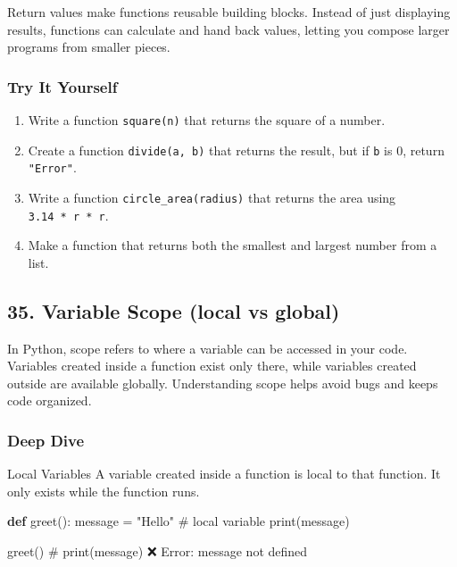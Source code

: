 \documentclass[
  letterpaper,
  DIV=11,
  numbers=noendperiod]{scrreprt}
\newenvironment{Shaded}{\begin{snugshade}}{\end{snugshade}}
\newcommand{\BuiltInTok}[1]{\textcolor[rgb]{0.00,0.23,0.31}{#1}}
\newcommand{\CommentTok}[1]{\textcolor[rgb]{0.37,0.37,0.37}{#1}}
\newcommand{\KeywordTok}[1]{\textcolor[rgb]{0.00,0.23,0.31}{\textbf{#1}}}
\newcommand{\NormalTok}[1]{\textcolor[rgb]{0.00,0.23,0.31}{#1}}
\newcommand{\OperatorTok}[1]{\textcolor[rgb]{0.37,0.37,0.37}{#1}}
\newcommand{\StringTok}[1]{\textcolor[rgb]{0.13,0.47,0.30}{#1}}
\providecommand{\tightlist}{%
  \setlength{\itemsep}{0pt}\setlength{\parskip}{0pt}}
\begin{document}
Return values make functions reusable building blocks. Instead of just
displaying results, functions can calculate and hand back values,
letting you compose larger programs from smaller pieces.

\subsubsection{Try It Yourself}\label{try-it-yourself-33}

\begin{enumerate}
\def\labelenumi{\arabic{enumi}.}
\tightlist
\item
  Write a function \texttt{square(n)} that returns the square of a
  number.
\item
  Create a function \texttt{divide(a,\ b)} that returns the result, but
  if \texttt{b} is 0, return \texttt{"Error"}.
\item
  Write a function \texttt{circle\_area(radius)} that returns the area
  using \texttt{3.14\ *\ r\ *\ r}.
\item
  Make a function that returns both the smallest and largest number from
  a list.
\end{enumerate}

\subsection{35. Variable Scope (local vs
global)}\label{variable-scope-local-vs-global}

In Python, scope refers to where a variable can be accessed in your
code. Variables created inside a function exist only there, while
variables created outside are available globally. Understanding scope
helps avoid bugs and keeps code organized.

\subsubsection{Deep Dive}\label{deep-dive-34}

Local Variables A variable created inside a function is local to that
function. It only exists while the function runs.

\begin{Shaded}
\begin{Highlighting}[]
\KeywordTok{def}\NormalTok{ greet():}
\NormalTok{    message }\OperatorTok{=} \StringTok{"Hello"}   \CommentTok{\# local variable}
    \BuiltInTok{print}\NormalTok{(message)}

\NormalTok{greet()}
\CommentTok{\# print(message) ❌ Error: message not defined}
\end{Highlighting}
\end{Shaded}
\end{document}
